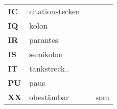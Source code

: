\begin{tabular}{l l l l}
\textbf{IC}       & citationstecken    &               & \\
\textbf{IQ}       &  kolon             &               & \\
\textbf{IR}       &  parantes          &               & \\
\textbf{IS}       &  semikolon         &                & \\ %
\textbf{IT}       &  tankstreck..      &                & \\ 
\textbf{PU}       &  paus              &               & \\ %
\vspace{2mm}
\textbf{XX}       &  obest\"ambar      &                & som \\ 
\end{tabular}
